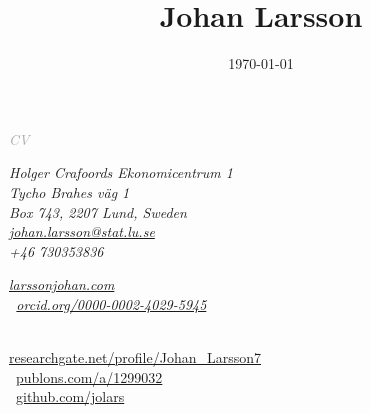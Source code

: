 \documentclass[
  10pt,
  headsepline=true,
  english,
  DIV=12
]{scrartcl}
\date{\today}
\title{Johan Larsson}
\renewcommand*{%
  \mkbibnamegiven
}[1]{\ifitemannotation{highlight}{\textbf{#1}}{#1}}
\renewcommand*{%
  \mkbibnamefamily
}[1]{\ifitemannotation{highlight}{\textbf{#1}}{#1}}
\begin{document}
\begin{titlepage}
\end{titlepage}

\begin{center}
  {\itshape \large \textcolor{darkgray}{CV}}
  \medskip

  \smallskip

  \noindent {\large \today}
\end{center}

\baselineskip

\begin{minipage}[t]{.5\textwidth}
  \small
  \itshape
  \noindent
  Holger Crafoords Ekonomicentrum 1\\
  Tycho Brahes väg 1\\
  Box 743, 2207 Lund, Sweden
  \vspace{1ex}\\
  \href{mailto:johan.larsson@stat.lu.se}{johan.larsson@stat.lu.se}\\
  +46 730353836

\end{minipage}%
\begin{minipage}[t]{0.5\textwidth}
  \raggedleft\itshape\small
  \href{https://larssonjohan.com}{larssonjohan.com}\\
  {\aiOrcid}\,
  \href{https://orcid.org/0000-0002-4029-5945}{orcid.org/0000-0002-4029-5945}\\
  {\aiResearchGate}\,

  \href{https://www.researchgate.net/profile/Johan_Larsson7}{researchgate.net/profile/Johan\_Larsson7}\\
  {\aiPublons}\, \href{https://publons.com/a/1299032}{publons.com/a/1299032}\\
  {\faGithub}\, \href{https://github.com/jolars}{github.com/jolars}
\end{minipage}
\end{document}
